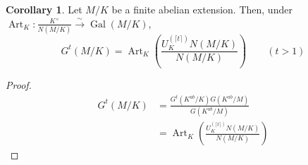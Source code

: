 \documentclass[a4paper]{article}
\theoremstyle{definition}
\theoremstyle{default}
\newtheorem{corollary}[definition]{Corollary}
\theoremstyle{remark}
\DeclareMathOperator{\Gal}{Gal}
\DeclareMathOperator{\Art}{Art}
\begin{document}
\begin{corollary}
	Let $M/K$ be a finite abelian extension.
	Then, under $\Art_K: \frac{K^\times}{N(M/K)} \overset{\sim}{\longrightarrow} \Gal(M/K)$,
	$$G^t(M/K) = \Art_K\left(\frac{U_K^{(\lceil t \rceil)}N(M/K)}{N(M/K)}\right) \qquad (t > 1)$$
\end{corollary}
\begin{proof}
	\begin{align*}
		G^t(M/K) &= \frac{G^t(K^{ab}/K)G(K^{ab}/M)}{G(K^{ab}/M)}\\
		&= \Art_K\left(\frac{U_K^{(\lceil t \rceil)}N(M/K)}{N(M/K)}\right)
	\end{align*}
\end{proof}
\end{document}
